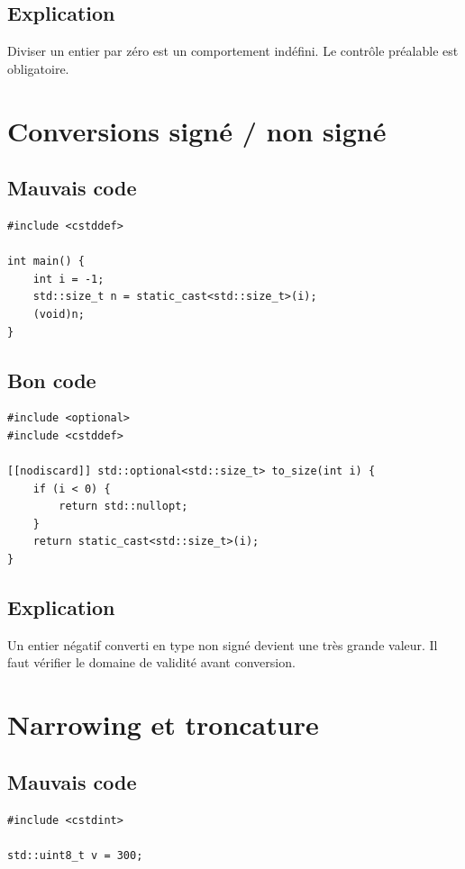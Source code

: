 \documentclass[a4paper,11pt]{report}
\begin{document}
\section{Explication}
Diviser un entier par zéro est un comportement indéfini.
Le contrôle préalable est obligatoire.

\chapter{Conversions signé / non signé}

\section{Mauvais code}
\begin{lstlisting}
#include <cstddef>

int main() {
    int i = -1;
    std::size_t n = static_cast<std::size_t>(i);
    (void)n;
}
\end{lstlisting}

\section{Bon code}
\begin{lstlisting}
#include <optional>
#include <cstddef>

[[nodiscard]] std::optional<std::size_t> to_size(int i) {
    if (i < 0) {
        return std::nullopt;
    }
    return static_cast<std::size_t>(i);
}
\end{lstlisting}

\section{Explication}
Un entier négatif converti en type non signé devient une très grande valeur.
Il faut vérifier le domaine de validité avant conversion.

\chapter{Narrowing et troncature}

\section{Mauvais code}
\begin{lstlisting}
#include <cstdint>

std::uint8_t v = 300;
\end{lstlisting}
\end{document}
